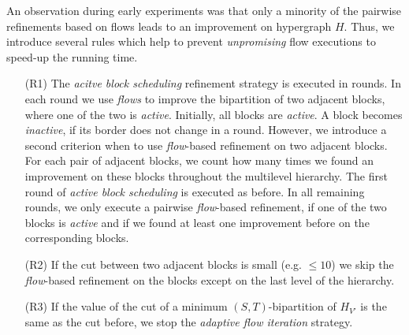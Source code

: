 \normalfont\normalsize
An observation during early experiments was that only a minority
of the pairwise refinements based on flows leads to an improvement
on hypergraph $H$. Thus, we introduce several rules which help to prevent
\emph{unpromising} flow executions to speed-up the running time.

\begin{enumerate}
\item[(R1)] The \emph{acitve block scheduling} refinement strategy is executed in rounds. In each
            round we use \emph{flows} to improve the bipartition of two adjacent blocks, where 
            one of the two is \emph{active}. Initially, all blocks are \emph{active}. 
            A block becomes \emph{inactive}, if its border does not change in a round. 
            However, we introduce a second criterion when to use \emph{flow}-based refinement
            on two adjacent blocks. For each pair of adjacent blocks, we count how
            many times we found an improvement on these blocks throughout the multilevel hierarchy.
            The first round of \emph{active block scheduling} is executed as before. In all remaining
            rounds, we only execute a pairwise \emph{flow}-based refinement, if one of the two 
            blocks is \emph{active} and if we found at least one improvement before on the
            corresponding blocks.
\item[(R2)] If the cut between two adjacent blocks is small (e.g. $\le 10$) we
            skip the \emph{flow}-based refinement on the blocks except on the last level of the hierarchy.
\item[(R3)] If the value of the cut of a minimum $(S,T)$-bipartition of $H_{V'}$ is the same 
            as the cut before, we stop the \emph{adaptive flow iteration} strategy.
\end{enumerate}


